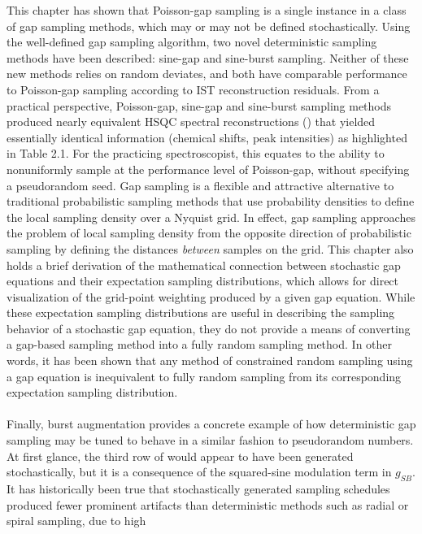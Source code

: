 \begin{doublespace}
This chapter has shown that Poisson-gap sampling is a single instance in a
class of gap sampling methods, which may or may not be defined stochastically.
Using the well-defined gap sampling algorithm, two novel deterministic sampling
methods have been described: sine-gap and sine-burst sampling. Neither of
these new methods relies on random deviates, and both have comparable
performance to Poisson-gap sampling according to IST reconstruction residuals.
From a practical perspective, Poisson-gap, sine-gap and sine-burst sampling
methods produced nearly equivalent HSQC spectral reconstructions
() that yielded essentially identical
information (chemical shifts, peak
intensities) as highlighted in Table 2.1. For the practicing spectroscopist,
this equates to the ability to nonuniformly sample at the performance level
of Poisson-gap, without specifying a pseudorandom seed. Gap sampling is a
flexible and attractive alternative to traditional probabilistic sampling
methods that use probability densities to define the local sampling density
over a Nyquist grid. In effect, gap sampling approaches the problem of local
sampling density from the opposite direction of probabilistic sampling by
defining the distances \emph{between} samples on the grid. This chapter also
holds a brief derivation of the mathematical connection between stochastic
gap equations and their expectation sampling distributions, which allows for
direct visualization of the grid-point weighting produced by a given gap
equation. While these expectation sampling distributions are useful in
describing the sampling behavior of a stochastic gap equation, they do not
provide a means of converting a gap-based sampling method into a fully random
sampling method. In other words, it has been shown that any method of
constrained random sampling using a gap equation is inequivalent to fully
random sampling from its corresponding expectation sampling distribution.
\\\\
Finally, burst augmentation provides a concrete example of how deterministic
gap sampling may be tuned to behave in a similar fashion to pseudorandom
numbers. At first glance, the third row of  would
appear to have been generated stochastically, but it is a consequence of the
squared-sine modulation term in $g_{SB}$. It has historically been true that
stochastically generated sampling schedules produced fewer prominent artifacts
than deterministic methods such as radial or spiral sampling, due to high

\end{doublespace}
